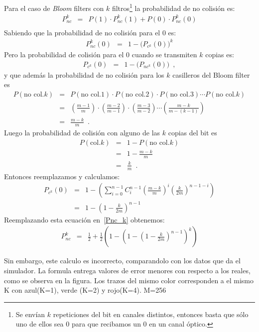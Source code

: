 \noindent Para el caso de {\em Bloom} filters con $k$ filtros\footnote{Se envían $k$ repeticiones del bit en canales distintos, entonces basta que sólo uno de ellos sea 0 para que recibamos un 0 en un canal óptico.} la probabilidad de no colisión es:
\begin{eqnarray} 
P_{nc}^{k} & = &  P(1) \cdot P_{nc}^{k}(1) + P(0) \cdot P_{nc}^{k}(0)\\ \label{Pnc_k}
\end{eqnarray}
Sabiendo que la probabilidad de no colisión para el 0 es:
\begin{eqnarray}
P_{nc}^{k}(0) & = & 1 - \big(P_{c^k}(0)\big)^k 
\end{eqnarray}
Pero la probabilidad de colisión para el 0 cuando se transmiten $k$ copias es:
\begin{eqnarray}
P_{c^k}(0) & = & 1 - \big(P_{nc^k}(0)\big)  \enspace,
\end{eqnarray}
y que además la probabilidad de no colisión para los $k$ casilleros del Bloom
filter es
\begin{eqnarray}
P(\mbox{no col.} k) &=& P(\mbox{no col.}1)\cdot P(\mbox{no col.}2)\cdot P(\mbox{no col.}3)\cdots P(\mbox{no col.}k)\\
&=&\left(\frac{m-1}{m}\right)\cdot\left(\frac{m-2}{m-1}\right)\cdot\left(\frac{m-3}{m-2}\right)\cdots\left(\frac{m-k}{m-(k-1)}\right)\\
&=& \frac{m-k}{m} \enspace.
\end{eqnarray}
Luego la probabilidad de colisión con alguno de las $k$ copias del bit es
\begin{eqnarray}
P(\mbox{col.}k)&=& 1-P(\mbox{no col.} k)\\
&=& 1-\frac{m-k}{m}\\
&=& \frac{k}{m} \enspace.
\end{eqnarray}
Entonces reemplazamos y calculamos:
\begin{eqnarray}
P_{c^k}(0) & = & 1 - \left(\sum_{i=0}^{n-1} C^{n-1}_{i} \left(\frac{m-k}{m}\right)^i \left(\frac{k}{2m}\right)^{n-1-i} \right)  \\
& = &  1-\left( 1-\frac{k}{2m}\right)^{n-1}
\end{eqnarray}
Reemplazando esta ecuación en~\ref{Pnc_k} obtenemos:
\begin{eqnarray}
P_{nc}^k & = & \frac{1}{2} + \frac{1}{2} \left( 1- \left( 1- \left( 1- \frac{k}{2m} \right)^{n-1}  \right)^{k}  \right) 
\end{eqnarray}

Sin embargo, este calculo es incorrecto, comparandolo con los datos que da el simulador. La formula entrega valores de error menores con respecto a los reales, como se observa en la figura. 
Los trazos del mismo color corresponden a el mismo K con azul(K=1), verde (K=2) y rojo(K=4). M=256

